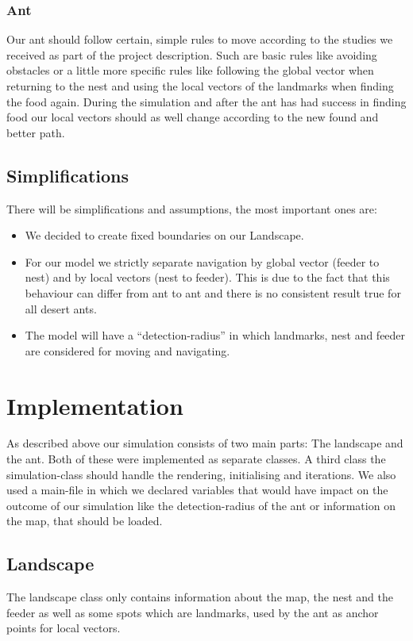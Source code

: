 \documentclass[11pt]{article}
\begin{document}
\subsubsection*{Ant}
Our ant should follow certain, simple rules to move according to the studies we received as part of the project description. Such are basic rules like avoiding obstacles or a little more specific rules like following the global vector when returning to the nest and using the local vectors of the landmarks when finding the food again. During the simulation and after the ant has had success in finding food our local vectors should as well change according to the new found and better path.

\subsection{Simplifications}
There will be simplifications and assumptions, the most important ones are:
\begin{itemize}
\item We decided to create fixed boundaries on our Landscape.
\item For our model we strictly separate navigation by global vector (feeder to nest) and by local vectors (nest to feeder). This is due to the fact that this behaviour can differ from ant to ant and there is no consistent result true for all desert ants.
\item The model will have a “detection-radius” in which landmarks, nest and feeder are considered for moving and navigating.
\end{itemize}
\newpage

\section{Implementation}
As described above our simulation consists of two main parts: The landscape and the ant. Both of these were implemented as separate classes. A third class the simulation-class should handle the rendering, initialising and iterations. We also used a main-file in which we declared variables that would have impact on the outcome of our simulation like the detection-radius of the ant or information on the map, that should be loaded.
\subsection{Landscape}
The landscape class only contains information about the map, the nest and the feeder as well as some spots which are landmarks, used by the ant as anchor points for local vectors.
\end{document}
